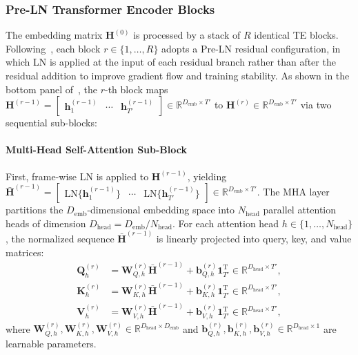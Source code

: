 \documentclass[lettersize,journal]{IEEEtran}
\begin{document}
\subsubsection{Pre-LN Transformer Encoder Blocks}
\label{sec:transformer_encoder_blocks}
The embedding matrix $\mathbf{H}^{(0)}$ is processed by a stack of $R$ identical \gls{TE} blocks. Following~\cite{cornell2022overlapped,nguyen2019transformers}, each block $r \in \{1, \dots, R\}$ adopts a Pre-\gls{LN} residual configuration, in which \gls{LN} is applied at the input of each residual branch rather than after the residual addition to improve gradient flow and training stability. As shown in the bottom panel of~, the $r$-th block maps $\mathbf{H}^{(r-1)} = \begin{bmatrix} \mathbf{h}_1^{(r-1)} & \cdots & \mathbf{h}_{T'}^{(r-1)} \end{bmatrix} \in \mathbb{R}^{D_{\mathrm{emb}} \times T'}$ to $\mathbf{H}^{(r)} \in \mathbb{R}^{D_{\mathrm{emb}} \times T'}$ via two sequential sub-blocks:

\paragraph{Multi-Head Self-Attention Sub-Block}
First, frame-wise \gls{LN} is applied to $\mathbf{H}^{(r-1)}$, yielding $\bar{\mathbf{H}}^{(r-1)} = \begin{bmatrix} \mathrm{LN}\{\mathbf{h}_1^{(r-1)}\} & \cdots & \mathrm{LN}\{\mathbf{h}_{T'}^{(r-1)}\} \end{bmatrix} \in \mathbb{R}^{D_{\mathrm{emb}} \times T'}$. The \gls{MHA} layer partitions the $D_{\mathrm{emb}}$-dimensional embedding space into $N_{\mathrm{head}}$ parallel attention heads of dimension $D_{\mathrm{head}} = D_{\mathrm{emb}} / N_{\mathrm{head}}$. For each attention head $h \in \{1, \dots, N_{\mathrm{head}}\}$, the normalized sequence $\bar{\mathbf{H}}^{(r-1)}$ is linearly projected into query, key, and value matrices:
\begin{align}
  \mathbf{Q}_h^{(r)} &= \mathbf{W}_{Q,h}^{(r)} \bar{\mathbf{H}}^{(r-1)} + \mathbf{b}_{Q,h}^{(r)} \mathbf{1}_{T'}^{\mathrm{T}} \in \mathbb{R}^{D_{\mathrm{head}} \times T'}, \label{eq:mha_q} \\
  \mathbf{K}_h^{(r)} &= \mathbf{W}_{K,h}^{(r)} \bar{\mathbf{H}}^{(r-1)} + \mathbf{b}_{K,h}^{(r)} \mathbf{1}_{T'}^{\mathrm{T}} \in \mathbb{R}^{D_{\mathrm{head}} \times T'}, \label{eq:mha_k} \\
  \mathbf{V}_h^{(r)} &= \mathbf{W}_{V,h}^{(r)} \bar{\mathbf{H}}^{(r-1)} + \mathbf{b}_{V,h}^{(r)} \mathbf{1}_{T'}^{\mathrm{T}} \in \mathbb{R}^{D_{\mathrm{head}} \times T'}, \label{eq:mha_v}
\end{align}
where $\mathbf{W}_{Q,h}^{(r)}, \mathbf{W}_{K,h}^{(r)}, \mathbf{W}_{V,h}^{(r)} \in \mathbb{R}^{D_{\mathrm{head}} \times D_{\mathrm{emb}}}$ and $\mathbf{b}_{Q,h}^{(r)}, \mathbf{b}_{K,h}^{(r)}, \mathbf{b}_{V,h}^{(r)} \in \mathbb{R}^{D_{\mathrm{head}} \times 1}$ are learnable parameters.
\end{document}
